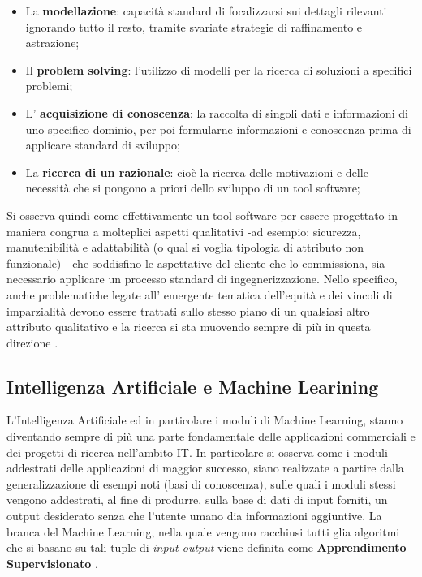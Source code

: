 \begin{itemize}
    \item La \textbf{modellazione}: capacità standard di focalizzarsi sui dettagli rilevanti ignorando tutto il resto, tramite svariate strategie di raffinamento e astrazione;
    \item Il \textbf{problem solving}: l'utilizzo di modelli per la ricerca di soluzioni a specifici problemi;
    \item L' \textbf{acquisizione di conoscenza}: la raccolta di singoli dati e informazioni di uno specifico dominio, per poi formularne informazioni e conoscenza prima di applicare standard di sviluppo;
    \item La \textbf{ricerca di un razionale}: cioè la ricerca delle motivazioni e delle necessità che si pongono a priori dello sviluppo di un tool software;
\end{itemize}

Si osserva quindi come effettivamente un tool software per essere progettato in maniera congrua a molteplici aspetti qualitativi -ad esempio: sicurezza, manutenibilità e adattabilità (o qual si voglia tipologia di attributo non funzionale) - che soddisfino le aspettative del cliente che lo commissiona, sia necessario applicare un processo standard di ingegnerizzazione. Nello specifico, anche problematiche legate all' emergente tematica dell'equità e dei vincoli di imparzialità devono essere trattati sullo stesso piano di un qualsiasi altro attributo qualitativo e la ricerca si sta muovendo sempre di più in questa direzione \cite{brun2018software}.
    

\subsection{Intelligenza Artificiale e Machine Learining}
L'Intelligenza Artificiale ed in particolare i moduli di Machine Learning, stanno diventando sempre di più una parte fondamentale delle applicazioni commerciali e dei progetti di ricerca nell'ambito IT. In particolare si osserva come i moduli addestrati delle applicazioni di maggior successo, siano realizzate a partire dalla generalizzazione di esempi noti (basi di conoscenza), sulle quali i moduli stessi vengono addestrati, al fine di produrre, sulla base di dati di input forniti, un output desiderato senza che l'utente umano dia informazioni aggiuntive. La branca del Machine Learning, nella quale vengono racchiusi tutti glia algoritmi che si basano su tali tuple di \textit{input-output} viene definita come  \textbf{Apprendimento Supervisionato} \cite{libroMLs}.


